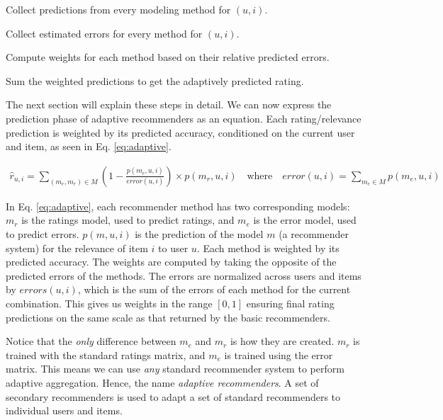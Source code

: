 \begin{enumerate*}
  \item Collect predictions from every modeling method for $(u,i)$.
  \item Collect estimated errors for every method for $(u,i)$.
  \item Compute weights for each method based on their relative predicted errors.
  \item Sum the weighted predictions to get the adaptively predicted rating.
\end{enumerate*}

The next section will explain these steps in detail.
We can now express the prediction phase of adaptive recommenders as an equation.
Each rating/relevance prediction is weighted by its predicted accuracy,
conditioned on the current user and item,
as seen in Eq. \ref{eq:adaptive}.

\begin{figure*}[!t]
\normalsize
\begin{eqnarray}
  \label{eq:adaptive}
  \hat{r}_{u,i} = \sum_{(m_{e}, m_{r}) \in M} (1 - 
  \frac{
    p(m_{e},u,i)
  }{
    error(u,i)
  }) \times p(m_{r},u,i)
  \quad
  \text{where}
  \quad
  error(u,i) = \sum_{m_e \in M} p(m_e,u,i) 
\end{eqnarray}
\hrulefill
\vspace*{4pt}
\end{figure*}

In Eq. \ref{eq:adaptive}, each recommender method has two corresponding models:
$m_r$ is the ratings model, used to predict ratings, and
$m_e$ is the error model, used to predict errors.
$p(m,u,i)$ is the prediction of the model $m$ (a recommender system)
for the relevance of item $i$ to user $u$.
Each method is weighted by its predicted accuracy.
The weights are computed by taking the opposite
of the predicted errors of the methods.
The errors are normalized across users and items by $errors(u,i)$,
which is the sum of the errors of each method for the current combination.
This gives us weights in the range $[0,1]$ ensuring
final rating predictions on the same scale as that returned by the basic recommenders.

Notice that the \emph{only} difference between $m_e$ and $m_r$ is how they are created.
$m_r$ is trained with the standard ratings matrix, and $m_e$ is trained using the error matrix.
This means we can use \emph{any} standard recommender system to perform adaptive aggregation.
Hence, the name \emph{adaptive recommenders}.
A set of secondary recommenders is used to adapt a set of standard
recommenders to individual users and items.

